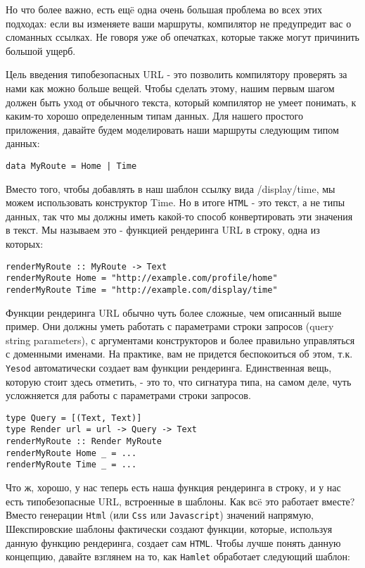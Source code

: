 Но что более важно, есть ещë одна очень большая проблема во всех этих подходах:
если вы изменяете ваши маршруты, компилятор не предупредит вас о сломанных
ссылках. Не говоря уже об опечатках, которые также могут причинить большой ущерб.

Цель введения типобезопасных URL - это позволить компилятору проверять за
нами как можно больше вещей. Чтобы сделать этому, нашим первым шагом
должен быть уход от обычного текста, который компилятор не умеет понимать,
к каким-то хорошо определенным типам данных. Для нашего простого приложения,
давайте будем моделировать наши маршруты следующим типом данных:

\begin{lstlisting}
data MyRoute = Home | Time
\end{lstlisting}

Вместо того, чтобы добавлять в наш шаблон ссылку вида /display/time, мы можем
использовать конструктор Time. Но в итоге \texttt{HTML} - это текст, а не типы данных,
так что мы должны иметь какой-то способ конвертировать эти значения в текст.
Мы называем это - функцией рендеринга URL в строку, одна из которых:

\begin{lstlisting}
renderMyRoute :: MyRoute -> Text
renderMyRoute Home = "http://example.com/profile/home"
renderMyRoute Time = "http://example.com/display/time"
\end{lstlisting}

\begin{remark}
Функции рендеринга URL обычно чуть более сложные, чем описанный выше пример.
Они должны уметь работать с параметрами строки запросов (query string parameters),
с аргументами конструкторов и более правильно управляться с доменными именами.
На практике, вам не придется беспокоиться об этом, т.к. \texttt{Yesod} автоматически
создает вам функции рендеринга. Единственная вещь, которую стоит здесь отметить,
 - это то, что сигнатура типа, на самом деле, чуть усложняется для
работы с параметрами строки запросов.

\begin{lstlisting}
type Query = [(Text, Text)]
type Render url = url -> Query -> Text
renderMyRoute :: Render MyRoute
renderMyRoute Home _ = ...
renderMyRoute Time _ = ...
\end{lstlisting}
\end{remark}

Что ж, хорошо, у нас теперь есть наша функция рендеринга в строку, и у нас есть
типобезопасные URL, встроенные в шаблоны. Как всë это работает вместе?
Вместо генерации \lstinline!Html! (или \lstinline!Css! или \lstinline!Javascript!) значений напрямую,
Шекспировские шаблоны фактически создают функции, которые, используя данную
функцию рендеринга, создает сам \texttt{HTML}. Чтобы лучше понять данную концепцию,
давайте взглянем на то, как \texttt{Hamlet} обработает следующий шаблон:

